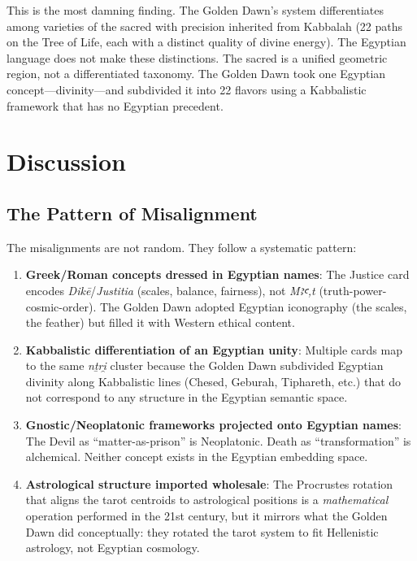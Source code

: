 \documentclass[11pt, a4paper]{article}
\begin{document}
This is the most damning finding. The Golden Dawn's system differentiates among varieties of the sacred with precision inherited from Kabbalah (22 paths on the Tree of Life, each with a distinct quality of divine energy). The Egyptian language does not make these distinctions. The sacred is a unified geometric region, not a differentiated taxonomy. The Golden Dawn took one Egyptian concept---divinity---and subdivided it into 22 flavors using a Kabbalistic framework that has no Egyptian precedent.

\section{Discussion}
\label{sec:discussion}

\subsection{The Pattern of Misalignment}

The misalignments are not random. They follow a systematic pattern:

\begin{enumerate}
    \item \textbf{Greek/Roman concepts dressed in Egyptian names}: The Justice card encodes \textit{Dikē}/\textit{Justitia} (scales, balance, fairness), not \textit{Mꜣꜥ,t} (truth-power-cosmic-order). The Golden Dawn adopted Egyptian iconography (the scales, the feather) but filled it with Western ethical content.

    \item \textbf{Kabbalistic differentiation of an Egyptian unity}: Multiple cards map to the same \textit{nṯri̯} cluster because the Golden Dawn subdivided Egyptian divinity along Kabbalistic lines (Chesed, Geburah, Tiphareth, etc.) that do not correspond to any structure in the Egyptian semantic space.

    \item \textbf{Gnostic/Neoplatonic frameworks projected onto Egyptian names}: The Devil as ``matter-as-prison'' is Neoplatonic. Death as ``transformation'' is alchemical. Neither concept exists in the Egyptian embedding space.

    \item \textbf{Astrological structure imported wholesale}: The Procrustes rotation that aligns the tarot centroids to astrological positions is a \textit{mathematical} operation performed in the 21st century, but it mirrors what the Golden Dawn did conceptually: they rotated the tarot system to fit Hellenistic astrology, not Egyptian cosmology.
\end{enumerate}
\end{document}
